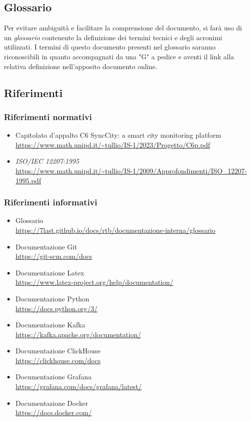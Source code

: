\subsection{Glossario}
Per evitare ambiguità e facilitare la comprensione del documento, si farà uso di un \textit{glossario} contenente la definizione dei termini tecnici e degli acronimi utilizzati. I termini di questo documento presenti nel glossario saranno riconoscibili in quanto accompagnati da una "G" a pedice e aventi il link alla relativa definizione nell'apposito documento online.

\subsection{Riferimenti}
\subsubsection{Riferimenti normativi}
\begin{itemize}
	\item Capitolato d'appalto C6 SyncCity: a smart city monitoring platform \\ \url{https://www.math.unipd.it/~tullio/IS-1/2023/Progetto/C6p.pdf}
	\item \textit{ISO/IEC 12207:1995} \\ \url{https://www.math.unipd.it/~tullio/IS-1/2009/Approfondimenti/ISO_12207-1995.pdf}
	
\end{itemize}
\subsubsection{Riferimenti informativi}
\begin{itemize}
    \item Glossario\\ \url{https://7last.github.io/docs/rtb/documentazione-interna/glossario}
    \item Documentazione Git\\ \url{https://git-scm.com/docs}
    \item Documentazione Latex\\ \url{https://www.latex-project.org/help/documentation/}
    \item Documentazione Python\\ \url{https://docs.python.org/3/}
    \item Documentazione Kafka\\ \url{https://kafka.apache.org/documentation/}
    \item Documentazione ClickHouse\\ \url{https://clickhouse.com/docs}
    \item Documentazione Grafana\\ \url{https://grafana.com/docs/grafana/latest/}
    \item Documentazione Docker\\ \url{https://docs.docker.com/}
\end{itemize}